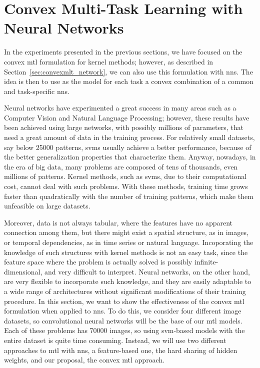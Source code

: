 \section{Convex Multi-Task Learning with Neural Networks}\label{sec:convexmtl_nn_experiments}
%
In the experiments presented in the previous sections, we have focused on the convex \acrshort{mtl} formulation for kernel methods; however, as described in Section~\ref{sec:convexmlt_network}, we can also use this formulation with \acrshort{nns}. The idea is then to use as the model for each task a convex combination of a common and task-specific \acrshort{nns}.

%
Neural networks have experimented a great success in many areas such as a Computer Vision and Natural Language Processing; however, these results have been achieved using large networks, with possibly millions of parameters, that need a great amount of data in the training process. For relatively small datasets, say below \num{25000} patterns, \acrshort{svms} usually achieve a better performance, because of the better generalization properties that characterize them.
%
Anyway, nowadays, in the era of big data, many problems are composed of tens of thousands, even millions of patterns. Kernel methods, such as \acrshort{svms}, due to their computational cost, cannot deal with such problems. With these methods, training time grows faster than quadratically with the number of training patterns, which make them unfeasible on large datasets.
%

Moreover, data is not always tabular, where the features have no apparent connection among them, but there might exist a spatial structure, as in images, or temporal dependencies, as in time series or natural language. Incoporating the knowledge of such structures with kernel methods is not an easy task, since the feature space where the problem is actually solved is possibly infinite-dimensional, and very difficult to interpret. Neural networks, on the other hand, are very flexible to incorporate such knowledge, and they are easily adaptable to a wide range of architectures without significant modifications of their training procedure.
%
In this section, we want to show the effectiveness of the convex \acrshort{mtl} formulation when applied to \acrshort{nns}. To do this, we consider four different image datasets, so convolutional neural networks will be the base of our \acrshort{mtl} models. Each of these problems has \num{70000} images, so using \acrshort{svm}-based models with the entire dataset is quite time consuming. Instead, we will use two different approaches to \acrshort{mtl} with \acrshort{nns}, a feature-based one, the hard sharing of hidden weights, and our proposal, the convex \acrshort{mtl} approach.


